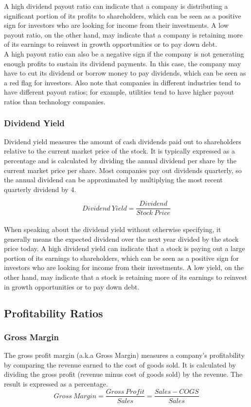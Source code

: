 \documentclass{article}
\begin{document}
A high dividend payout ratio can indicate that a company is distributing a significant portion of its profits to shareholders, which can be seen as a positive sign for investors who are looking for income from their investments. A low payout ratio, on the other hand, may indicate that a company is retaining more of its earnings to reinvest in growth opportunities or to pay down debt.\\

A high payout ratio can also be a negative sign if the company is not generating enough profits to sustain its dividend payments. In this case, the company may have to cut its dividend or borrow money to pay dividends, which can be seen as a red flag for investors. Also note that companies in different industries tend to have different payout ratios; for example, utilities tend to have higher payout ratios than technology companies.

\subsubsection{Dividend Yield}
Dividend yield measures the amount of cash dividends paid out to shareholders relative to the current market price of the stock. It is typically expressed as a percentage and is calculated by dividing the annual dividend per share by the current market price per share. Most companies pay out dividends quarterly, so the annual dividend can be approximated by multiplying the most recent quarterly dividend by 4. 

\begin{equation}
    Dividend\: Yield = \frac{Dividend}{Stock\: Price}
\end{equation}\\

When speaking about the dividend yield without otherwise specifying, it generally means the expected dividend over the next year divided by the stock price today. A high dividend yield can indicate that a stock is paying out a large portion of its earnings to shareholders, which can be seen as a positive sign for investors who are looking for income from their investments. A low yield, on the other hand, may indicate that a stock is retaining more of its earnings to reinvest in growth opportunities or to pay down debt.
\subsection{Profitability Ratios}
\subsubsection{Gross Margin}
The gross profit margin (a.k.a Gross Margin) measures a company's profitability by comparing the revenue earned to the cost of goods sold. It is calculated by dividing the gross profit (revenue minus cost of goods sold) by the revenue. The result is expressed as a percentage.
\begin{equation}
    Gross\: Margin = \frac{Gross\: Profit}{Sales} = \frac{Sales - COGS}{Sales}
\end{equation}\\
\end{document}
